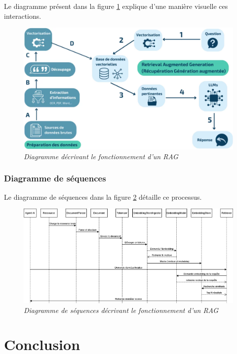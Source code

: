 \documentclass[12pt,a4paper]{report}
\begin{document}
	Le diagramme présent dans la figure \ref{fig:diagramme-rag} explique d'une manière visuelle ces interactions.
	
	\begin{figure}[H]
		\centering
		\includegraphics[width=1\textwidth]{diagramme-rag.png}
		\caption{\textit{Diagramme décrivant le fonctionnement d'un RAG}}
		\label{fig:diagramme-rag}
	\end{figure}
	
	\subsubsection{Diagramme de séquences}
	
	Le diagramme de séquences dans la figure \ref{fig:ds-rag.drawio} détaille ce processus.
	
	\begin{figure}[H]
		\centering
		\includegraphics[width=1\textwidth]{ds-rag.drawio.png}
		\caption{\textit{Diagramme de séquences décrivant le fonctionnement d'un RAG}}
		\label{fig:ds-rag.drawio}
	\end{figure}
	
	\section{Conclusion}
	
\end{document}
